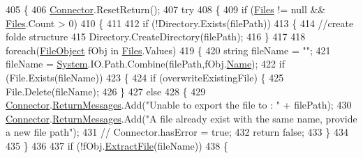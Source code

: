 \begin{DoxyCode}
405     \{
406         \mbox{\hyperlink{class_connector}{Connector}}.ResetReturn();
407         \textcolor{keywordflow}{try}
408         \{
409             \textcolor{keywordflow}{if} (\mbox{\hyperlink{class_document_object_afe6bcf5175607f91dde768491f23a0a4}{Files}} != null && \mbox{\hyperlink{class_document_object_afe6bcf5175607f91dde768491f23a0a4}{Files}}.Count > 0)
410             \{
411               
412                 \textcolor{keywordflow}{if} (!Directory.Exists(filePath))
413                 \{
414                     \textcolor{comment}{//create folde structure}
415                     Directory.CreateDirectory(filePath);
416                 \}
417                 
418                 \textcolor{keywordflow}{foreach}(\mbox{\hyperlink{class_file_object}{FileObject}} fObj \textcolor{keywordflow}{in} \mbox{\hyperlink{class_document_object_afe6bcf5175607f91dde768491f23a0a4}{Files}}.Values)
419                 \{
420                     \textcolor{keywordtype}{string} fileName = \textcolor{stringliteral}{""};
421                     fileName = \mbox{\hyperlink{namespace_system}{System}}.IO.Path.Combine(filePath,fObj.\mbox{\hyperlink{class_file_object_a9d47aff166393cb47490da2661576d62}{Name}});
422                     \textcolor{keywordflow}{if} (File.Exists(fileName))
423                     \{
424                         \textcolor{keywordflow}{if} (overwriteExistingFile) \{
425                             File.Delete(fileName);
426                         \}
427                         \textcolor{keywordflow}{else}
428                         \{
429                             \mbox{\hyperlink{class_connector}{Connector}}.\mbox{\hyperlink{class_connector_a1ed422674b344524fd77998dcf6a9ba6}{ReturnMessages}}.Add(\textcolor{stringliteral}{"Unable to export the file
       to : "} + filePath);
430                             \mbox{\hyperlink{class_connector}{Connector}}.\mbox{\hyperlink{class_connector_a1ed422674b344524fd77998dcf6a9ba6}{ReturnMessages}}.Add(\textcolor{stringliteral}{"A file already exist with
       the same name, provide a new file path"});
431                             \textcolor{comment}{// Connector.hasError = true;}
432                             \textcolor{keywordflow}{return} \textcolor{keyword}{false};
433                         \}
434                       
435                     \}
436 
437                     \textcolor{keywordflow}{if} (!fObj.\mbox{\hyperlink{class_file_object_ae21fac09c5ab2f9fac96a3f084cb9ddc}{ExtractFile}}(fileName))
438                     \{

\end{DoxyCode}
